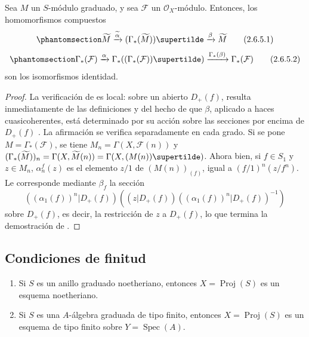 \documentclass[oneside,10pt]{amsart}
\let\EGAOriginalLabel\label
\renewcommand{\label}[1]{\phantomsection\EGAOriginalLabel{#1}}
\begin{document}
\begin{proposition}[2.6.5]
\label{II.2.6.5-fr}
Sea $M$ un $S$-módulo graduado, y sea $\mathcal{F}$ un $\mathcal{O}_X$-módulo.
Entonces, los homomorfismos compuestos
\[
\label{II.2.6.5.1-fr}
  \widetilde{M}\xrightarrow{\widetilde{\alpha}}
  (\Gamma_*(\widetilde{M}))\supertilde
  \xrightarrow{\beta}\widetilde{M}
\tag{2.6.5.1}
\]
\[
\label{II.2.6.5.2-fr}
  \Gamma_*(\mathcal{F})\xrightarrow{\alpha}
  \Gamma_*((\Gamma_*(\mathcal{F}))\supertilde)
  \xrightarrow{\Gamma_*(\beta)}\Gamma_*(\mathcal{F})
\tag{2.6.5.2}
\]
son los isomorfismos identidad.
\end{proposition}

\begin{proof}
La verificación de  es local: sobre un abierto $D_+(f)$, resulta inmediatamente de las definiciones y del hecho de que $\beta$, aplicado a haces cuasicoherentes, está determinado por su acción sobre las secciones por encima de $D_+(f)$ .
La afirmación  se verifica separadamente en cada grado.
Si se pone $M=\Gamma_*(\mathcal{F})$, se tiene $M_n=\Gamma(X,\mathcal{F}(n))$ y
$(\Gamma_*(\widetilde{M}))_n=\Gamma(X,\widetilde{M}(n))
=\Gamma(X,(M(n))\supertilde)$.
Ahora bien, si $f\in S_1$ y $z\in M_n$, $\alpha_n^f(z)$ es el elemento $z/1$ de $(M(n))_{(f)}$, igual a $(f/1)^n(z/f^n)$.
Le corresponde mediante $\beta_f$ la sección
\[
  ((\alpha_1(f))^n|D_+(f))
  ((z|D_+(f))((\alpha_1(f))^n|D_+(f))^{-1})
\]
sobre $D_+(f)$, es decir, la restricción de $z$ a $D_+(f)$, lo que termina la demostración de .
\end{proof}


\subsection{Condiciones de finitud}
\label{subsection:II.2.7-fr}

\begin{proposition}[2.7.1]
\label{II.2.7.1-fr}
\begin{enumerate}
  \item[{\rm(i)}] Si $S$ es un anillo graduado noetheriano, entonces $X=\operatorname{Proj}(S)$ es un esquema noetheriano.
  \item[{\rm(ii)}] Si $S$ es una $A$-álgebra graduada de tipo finito, entonces $X=\operatorname{Proj}(S)$ es un esquema de tipo finito sobre $Y=\operatorname{Spec}(A)$.
\end{enumerate}
\end{proposition}
\end{document}
